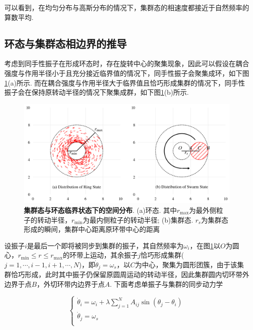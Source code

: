 \documentclass{article}
\begin{document}
\vspace{-0.5cm}

可以看到，在均匀分布与高斯分布的情况下，集群态的相速度都接近于自然频率的算数平均.

\subsection{环态与集群态相边界的推导}

考虑到同手性振子在形成环态时，存在旋转中心的聚集现象，因此可以假设在耦合强度与作用半径小于且充分接近临界值的情况下，同手性振子会聚集成环，如下图\ref{fig:fig23.1}(a)所示. 而在耦合强度与作用半径大于临界值且恰巧形成集群的情况下，同手性振子会在保持原转动半径的情况下聚集成群，如下图\ref{fig:fig23.1}(b)所示.

\begin{figure}[H]
	\centering
	\includegraphics[width=\textwidth]{./figs/circleSwarmEdges1.png}
	\vspace{-1cm}
	\caption{\small \textbf{集群态与环态临界状态下的空间分布}. (a)环态. 其中$r_{\max}$为最外侧粒子的转动半径，$r_{\min}$为最内侧粒子的转动半径; (b)集群态. $r_{s}$为集群态形成的瞬间，集群中心距离原环带中心的距离}
	\label{fig:fig23.1}
\end{figure}

设振子$i$是最后一个即将被同步到集群的振子，其自然频率为$\omega _i$，在图\ref{fig:fig23.1}以$O$为圆心，$r_{\min}\leqslant r\leqslant r_{\max}$的环带上运动，其余振子$j$恰巧形成集群($j=1,\cdots ,i-1,i+1,\cdots ,N$)，即$\dot{\theta}_j=\omega_s$，以$C$为中心，聚集为圆形团簇，由于该集群恰巧形成，此时其中振子仍保留原圆周运动的转动半径，因此集群圆内切环带外边界于点$B$，外切环带内边界于点$A$. 下面考虑单振子与集群的同步动力学

\begin{equation}\label{eq:eq2}
	\begin{cases}
		\dot{\theta}_i=\omega _i+\lambda \sum_{j=1}^N{A_{ij}\sin \left( \theta _j-\theta _i \right)}\\
		\dot{\theta}_j=\omega _s\\
	\end{cases}
\end{equation}
\end{document}
